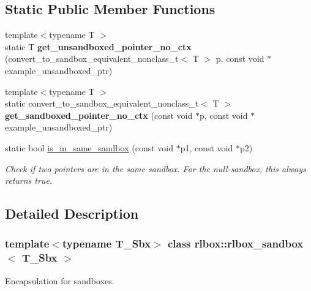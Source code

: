 \subsection*{Static Public Member Functions}
\begin{DoxyCompactItemize}
\item 
\mbox{\label{classrlbox_1_1rlbox__sandbox_a030d5e296cdeb24cd4ca99a5cbe0ea39}} 
{\footnotesize template$<$typename T $>$ }\\static T {\bfseries get\+\_\+unsandboxed\+\_\+pointer\+\_\+no\+\_\+ctx} (convert\+\_\+to\+\_\+sandbox\+\_\+equivalent\+\_\+nonclass\+\_\+t$<$ T $>$ p, const void $\ast$example\+\_\+unsandboxed\+\_\+ptr)
\item 
\mbox{\label{classrlbox_1_1rlbox__sandbox_a37e1e1468b883faf8a878b3c0a221d39}} 
{\footnotesize template$<$typename T $>$ }\\static convert\+\_\+to\+\_\+sandbox\+\_\+equivalent\+\_\+nonclass\+\_\+t$<$ T $>$ {\bfseries get\+\_\+sandboxed\+\_\+pointer\+\_\+no\+\_\+ctx} (const void $\ast$p, const void $\ast$example\+\_\+unsandboxed\+\_\+ptr)
\item 
\mbox{\label{classrlbox_1_1rlbox__sandbox_a3257ffc0e7eb6022c05a049b8b36271f}} 
static bool \hyperlink{classrlbox_1_1rlbox__sandbox_a3257ffc0e7eb6022c05a049b8b36271f}{is\+\_\+in\+\_\+same\+\_\+sandbox} (const void $\ast$p1, const void $\ast$p2)
\begin{DoxyCompactList}\small\item\em Check if two pointers are in the same sandbox. For the null-\/sandbox, this always returns true. \end{DoxyCompactList}\end{DoxyCompactItemize}


\subsection{Detailed Description}
\subsubsection*{template$<$typename T\+\_\+\+Sbx$>$\newline
class rlbox\+::rlbox\+\_\+sandbox$<$ T\+\_\+\+Sbx $>$}

Encapsulation for sandboxes. 


